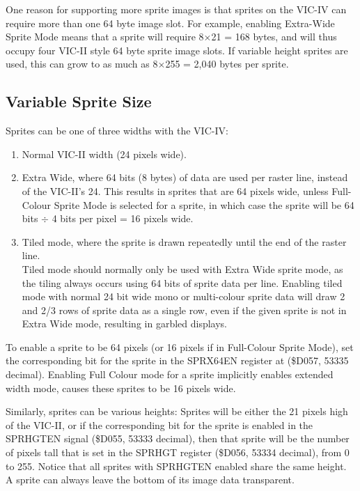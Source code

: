 One reason for supporting more sprite images is that sprites on the VIC-IV can require more than one 64 byte image slot.
For example, enabling Extra-Wide Sprite Mode means that a sprite will require 8$\times$21 = 168 bytes, and will thus occupy
four VIC-II style 64 byte sprite image slots.  If variable height sprites are used, this can grow to as much as  8$\times$255 = 2,040 bytes per sprite.

\subsection{Variable Sprite Size}

Sprites can be one of three widths with the VIC-IV:

\begin{enumerate}
\item Normal VIC-II width (24 pixels wide).
\item Extra Wide, where 64 bits (8 bytes) of data are used per raster line, instead of the VIC-II's 24.
  This results in sprites that are 64 pixels wide, unless Full-Colour Sprite Mode is selected for a sprite,
  in which case the sprite will be 64 bits $\div$ 4 bits per pixel = 16 pixels wide.
\item Tiled mode, where the sprite is drawn repeatedly until the end of the raster line. \\
  Tiled mode should normally only be used with Extra Wide sprite mode, as the tiling always occurs using 64 bits of sprite data per line. Enabling tiled mode with normal 24 bit wide mono or multi-colour sprite data will draw 2 and 2/3 rows of sprite data as a single row, even if the given sprite is not in Extra Wide mode, resulting in garbled displays.
\end{enumerate}

To enable a sprite to be 64 pixels (or 16 pixels if in Full-Colour Sprite Mode), set the corresponding bit for the sprite in the SPRX64EN register at (\$D057, 53335 decimal).  Enabling Full Colour mode for a sprite implicitly enables extended width mode, causes these sprites to be 16 pixels wide.

Similarly, sprites can be various heights:  Sprites will be either the 21 pixels high of the VIC-II, or if the corresponding bit for the sprite is enabled in the SPRHGTEN signal (\$D055, 53333 decimal), then that sprite will be the number of pixels tall that is set in the SPRHGT
register (\$D056, 53334 decimal), from 0 to 255. Notice that all sprites with SPRHGTEN enabled share the same height. A sprite can always leave the bottom of its image data transparent.

